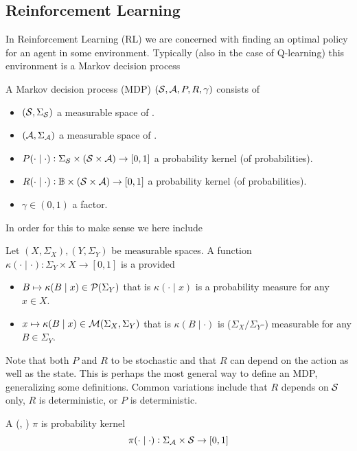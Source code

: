 \subsection{Reinforcement Learning}
In Reinforcement Learning (RL) we are concerned with finding an optimal policy
for an agent in some environment.
Typically (also in the case of Q-learning) this environment is a
Markov decision process

\begin{defn}
	A Markov decision process (MDP) $(\mathcal{S}, \mathcal{A}, P, R, \gamma)$
	consists of
\begin{itemize}
  \item $(\mathcal{S}, \Sigma_{\mathcal{S}})$ a measurable space of .
  \item $(\mathcal{A}, \Sigma_{\mathcal{A}})$ a measurable space of .
  \item $P(\cdot \mid \cdot) : \Sigma_{\mathcal{S}} \times (\mathcal{S} \times \mathcal{A})
    \to [0,1]$ a probability kernel (of  probabilities).
  \item $R(\cdot \mid \cdot) : \mathbb{B} \times (\mathcal{S} \times \mathcal{A})
    \to [0,1]$ a probability kernel (of  probabilities).
  \item $\gamma \in (0,1)$ a  factor.
\end{itemize}
\end{defn}

In order for this to make sense we here include
\begin{defn}
  Let $(X, \Sigma_X), (Y, \Sigma_Y)$ be measurable spaces.
  A function $\kappa(\cdot \mid \cdot) : \Sigma_Y \times X \to [0,1]$
  is a  provided
  \begin{itemize}
    \item $B \mapsto \kappa(B \mid x) \in \mathcal{P}(\Sigma_Y)$
      that is $\kappa(\cdot \mid x)$ is a probability measure
      for any $x \in X$.
    \item $x \mapsto \kappa(B \mid x) \in \mathcal{M}(\Sigma_X, \Sigma_Y)$
      that is $\kappa(B \mid \cdot)$ is ($\Sigma_X/\Sigma_Y$-) measurable
      for any $B \in \Sigma_Y$.
  \end{itemize}
\end{defn}

Note that both $P$ and $R$ to be stochastic
and that $R$ can depend on the action as well as the state.
This is perhaps the most general way to define an MDP,
generalizing some definitions. Common variations include that
$R$ depends on $\mathcal{S}$ only,
$R$ is deterministic, or
$P$ is deterministic. %
\begin{defn}[Policy]
A (, ) 
$\pi$ is probability kernel
\[\pi(\cdot \mid \cdot) : \Sigma_{\mathcal{A}} \times \mathcal{S} \to [0,1] \]
\end{defn}

